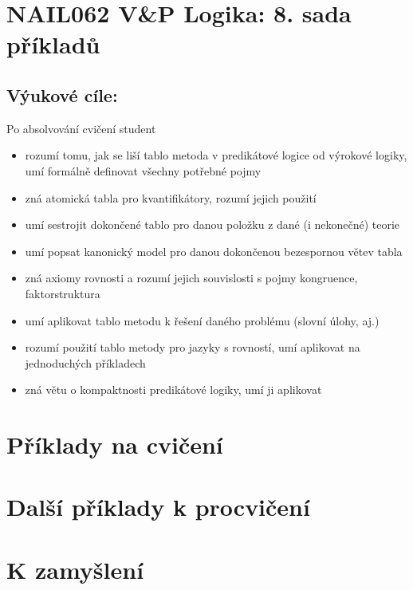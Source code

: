 \section*{NAIL062 V\&P Logika: 8. sada příkladů}


\subsection*{Výukové cíle:} Po absolvování cvičení student

    \begin{itemize}\setlength{\itemsep}{0pt}
        \item rozumí tomu, jak se liší tablo metoda v predikátové logice od výrokové logiky, umí formálně definovat všechny potřebné pojmy
        \item zná atomická tabla pro kvantifikátory, rozumí jejich použití
        \item umí sestrojit dokončené tablo pro danou položku z dané (i nekonečné) teorie
        \item umí popsat kanonický model pro danou dokončenou bezespornou větev tabla
        \item zná axiomy rovnosti a rozumí jejich souvislosti s pojmy kongruence, faktorstruktura
        \item umí aplikovat tablo metodu k řešení daného problému (slovní úlohy, aj.)
        \item rozumí použití tablo metody pro jazyky s rovností, umí aplikovat na jednoduchých příkladech
        \item zná větu o kompaktnosti predikátové logiky, umí ji aplikovat
    \end{itemize}
    

\section*{Příklady na cvičení}


\begin{problem}


    \begin{solution}
                    
    \end{solution}

\end{problem}

        
        
\section*{Další příklady k procvičení}

        
\section*{K zamyšlení}



